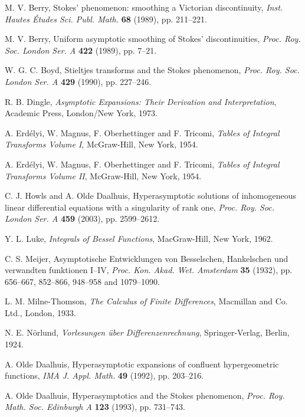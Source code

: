 \documentclass[a4paper,twoside,10pt]{amsart}
\numberwithin{equation}{section}
\begin{document}
\begin{thebibliography}{10}

M. V. Berry, Stokes' phenomenon: smoothing a Victorian discontinuity, \emph{Inst. Hautes \'{E}tudes Sci. Publ. Math.} \textbf{68} (1989), pp. 211--221.

M. V. Berry, Uniform asymptotic smoothing of Stokes' discontinuities, \emph{Proc. Roy. Soc. London Ser. A} \textbf{422} (1989), pp. 7--21.

W. G. C. Boyd, Stieltjes transforms and the Stokes phenomenon,
\emph{Proc. Roy. Soc. London Ser. A} \textbf{429} (1990), pp. 227--246.

R. B. Dingle, \emph{Asymptotic Expansions: Their Derivation and Interpretation},
Academic Press, London/New York, 1973.

A. Erd\'elyi, W. Magnus, F. Oberhettinger and F. Tricomi, \emph{Tables of Integral Transforms Volume I}, McGraw-Hill, New York, 1954.

A. Erd\'elyi, W. Magnus, F. Oberhettinger and F. Tricomi, \emph{Tables of Integral Transforms Volume II}, McGraw-Hill, New York, 1954.

C. J. Howls and A. Olde Daalhuis, Hyperasymptotic solutions of inhomogeneous linear differential equations with a singularity of rank one, \emph{Proc. Roy. Soc. London Ser. A} \textbf{459} (2003), pp. 2599--2612.

Y. L. Luke, \emph{Integrals of Bessel Functions}, MacGraw-Hill, New York, 1962.

C. S. Meijer, Asymptotische Entwicklungen von Besselschen, Hankelschen und verwandten funktionen I--IV, \emph{Proc. Kon. Akad. Wet. Amsterdam} \textbf{35} (1932), pp. 656--667, 852--866, 948--958 and 1079--1090.

L. M. Milne-Thomson, \emph{The Calculus of Finite Differences}, Macmillan and Co. Ltd., London, 1933.

N. E. N\"{o}rlund, \emph{Vorlesungen \"{u}ber Differenzenrechnung}, Springer-Verlag, Berlin, 1924.

A. Olde Daalhuis, Hyperasymptotic expansions of confluent hypergeometric functions, \emph{IMA J. Appl. Math.} \textbf{49} (1992), pp. 203--216.

A. Olde Daalhuis, Hyperasymptotics and the Stokes phenomenon, \emph{Proc. Roy. Math. Soc. Edinburgh A} \textbf{123} (1993), pp. 731--743.


\end{thebibliography}
\end{document}
